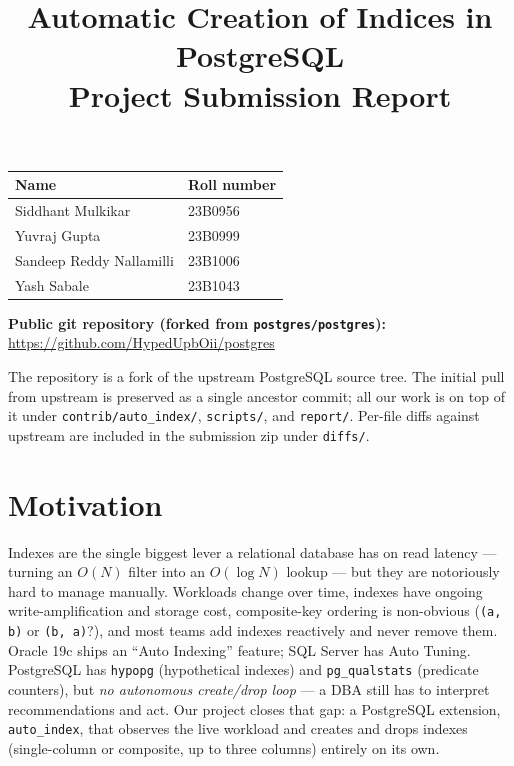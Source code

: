 \documentclass[10pt,a4paper]{article}
\title{\textbf{Automatic Creation of Indices in PostgreSQL\\\large Project Submission Report}}
\author{}
\date{}
\newcommand{\code}[1]{\texttt{\small #1}}
\begin{document}
\maketitle
\vspace{-3.5em}

\begin{center}
\begin{tabular}{ll}
\toprule
\textbf{Name} & \textbf{Roll number} \\
\midrule
Siddhant Mulkikar         & 23B0956 \\
Yuvraj Gupta              & 23B0999 \\
Sandeep Reddy Nallamilli  & 23B1006 \\
Yash Sabale               & 23B1043 \\
\bottomrule
\end{tabular}
\end{center}

\vspace{0.5em}
\noindent\textbf{Public git repository (forked from \code{postgres/postgres}):}\\
\url{https://github.com/HypedUpbOii/postgres}

\vspace{0.5em}
\noindent The repository is a fork of the upstream PostgreSQL source tree.
The initial pull from upstream is preserved as a single ancestor commit;
all our work is on top of it under \code{contrib/auto\_index/},
\code{scripts/}, and \code{report/}. Per-file diffs against upstream are
included in the submission zip under \code{diffs/}.

\section{Motivation}

Indexes are the single biggest lever a relational database has on read
latency --- turning an \(O(N)\) filter into an \(O(\log N)\) lookup ---
but they are notoriously hard to manage manually. Workloads change over
time, indexes have ongoing write-amplification and storage cost,
composite-key ordering is non-obvious (\code{(a,\,b)} or
\code{(b,\,a)}?), and most teams add indexes reactively and never
remove them. Oracle 19c ships an ``Auto Indexing'' feature; SQL Server
has Auto Tuning. PostgreSQL has \code{hypopg} (hypothetical indexes)
and \code{pg\_qualstats} (predicate counters), but \emph{no autonomous
create/drop loop} --- a DBA still has to interpret recommendations and
act. Our project closes that gap: a PostgreSQL extension,
\code{auto\_index}, that observes the live workload and creates and
drops indexes (single-column or composite, up to three columns)
entirely on its own.
\end{document}
